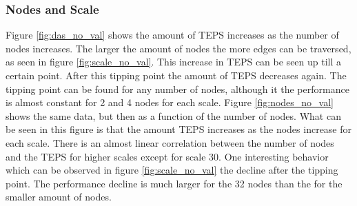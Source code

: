 \subsubsection{Nodes and Scale}
\label{res:nodes_scale}
Figure \ref{fig:das_no_val} shows the amount of TEPS increases as the number of nodes increases. The larger the amount of nodes the more edges can be traversed, as seen in figure \ref{fig:scale_no_val}. This increase in TEPS can be seen up till a certain point. After this tipping point the amount of TEPS decreases again. The tipping point can be found for any number of nodes, although it the performance is almost constant for 2 and 4 nodes for each scale.
Figure \ref{fig:nodes_no_val} shows the same data, but then as a function of the number of nodes. What can be seen in this figure is that the amount TEPS increases as the nodes increase for each scale. There is an almost linear correlation between the number of nodes and the TEPS for higher scales except for scale 30. One interesting behavior which can be observed in figure \ref{fig:scale_no_val} the decline after the tipping point. The performance decline is much larger for the 32 nodes than the for the smaller amount of nodes.

